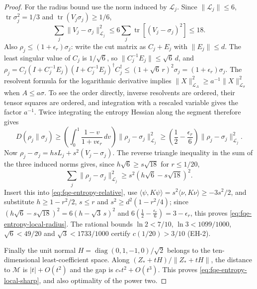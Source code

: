 \begin{proof}
For the radius bound use the norm induced by $\mathcal L_j$.
Since $\|\mathcal L_j\|\le6$, $\operatorname{tr}\sigma_j^2=1/3$
and $\operatorname{tr}(V_j\sigma_j)\ge1/6$,
\[
 \sum_j\|V_j-\sigma_j\|_{\mathcal L_j}^2
 \le6\sum_j\operatorname{tr}[(V_j-\sigma_j)^2]\le18.
\]
Also $\rho_j\le(1+\epsilon_r)\sigma_j$: write the cut matrix as
$C_j+E_j$ with $\|E_j\|\le d$. The least singular value of $C_j$ is
$1/\sqrt6$, so $\|C_j^{-1}E_j\|\le\sqrt6\,d$, and
$\rho_j=C_j(I+C_j^{-1}E_j)(I+C_j^{-1}E_j)^\dagger C_j^\dagger
\le(1+\sqrt6\,r)^2\sigma_j=(1+\epsilon_r)\sigma_j$.
The resolvent formula for the logarithmic derivative implies
$\|X\|_{\mathcal L_A}^2\ge a^{-1}\|X\|_{\mathcal L_\sigma}^2$
when $A\le a\sigma$. To see the order directly, inverse resolvents
are ordered, their tensor squares are ordered, and integration with
a rescaled variable gives the factor $a^{-1}$.
Twice integrating the entropy Hessian along the segment therefore gives
\[
 D(\rho_j\|\sigma_j)\ge
 \left(\int_0^1\frac{1-v}{1+v\epsilon_r}\,dv\right)
           \|\rho_j-\sigma_j\|_{\mathcal L_j}^2
 \ge\left(\frac12-\frac{\epsilon_r}{6}\right)
           \|\rho_j-\sigma_j\|_{\mathcal L_j}^2.
\]
Now $\rho_j-\sigma_j=hsL_j+s^2(V_j-\sigma_j)$. The reverse
triangle inequality in the sum of the three induced norms gives,
since $h\sqrt6\ge s\sqrt{18}$ for $r\le1/20$,
\[
 \sum_j\|\rho_j-\sigma_j\|_{\mathcal L_j}^2
 \ge s^2(h\sqrt6-s\sqrt{18})^2.
\]
Insert this into \eqref{eq:fqe-entropy-relative}, use
$\langle\psi,K\psi\rangle=s^2\langle\nu,K\nu\rangle\ge-3s^2/2$,
and substitute $h\ge1-r^2/2$, $s\le r$ and
$s^2\ge d^2(1-r^2/4)$; since $(h\sqrt6-s\sqrt{18})^2=6(h-\sqrt3\,s)^2$ and
$6(\frac12-\frac{\epsilon_r}6)=3-\epsilon_r$, this proves \eqref{eq:fqe-entropy-local-radius}.
The rational bounds $\ln2<7/10$, $\ln3<1099/1000$,
$\sqrt6<49/20$ and $\sqrt3<1733/1000$
certify $c(1/20)>3/10$ (EH-2).

Finally the unit normal $H=\operatorname{diag}(0,1,-1,0)/\sqrt2$
belongs to the ten-dimensional least-coefficient space. Along
$(Z_*+tH)/\|Z_*+tH\|$, the distance to $\mathcal M$ is
$|t|+O(t^2)$ and the gap is $c_*t^2+O(t^3)$. This proves
\eqref{eq:fqe-entropy-local-sharp}, and also optimality of the power two.
\end{proof}
